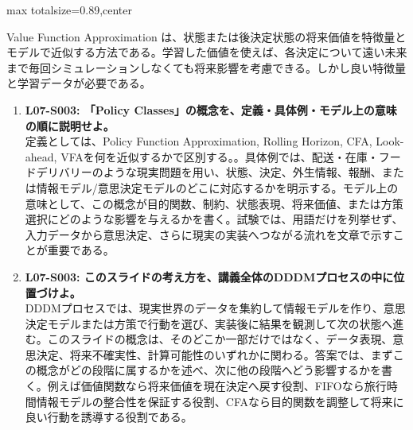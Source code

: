 \begin{minipage}[t]{0.58\textwidth}
\begin{adjustbox}{max totalsize={\textwidth}{0.89\textheight},center}
\begin{minipage}{\textwidth}
Value Function Approximation は、状態または後決定状態の将来価値を特徴量とモデルで近似する方法である。学習した価値を使えば、各決定について遠い未来まで毎回シミュレーションしなくても将来影響を考慮できる。しかし良い特徴量と学習データが必要である。\par{}\begin{enumerate}\item \textbf{L07-S003: 「Policy Classes」の概念を、定義・具体例・モデル上の意味の順に説明せよ。}\\定義としては、Policy Function Approximation, Rolling Horizon, CFA, Look-ahead, VFAを何を近似するかで区別する。。具体例では、配送・在庫・フードデリバリーのような現実問題を用い、状態、決定、外生情報、報酬、または情報モデル/意思決定モデルのどこに対応するかを明示する。モデル上の意味として、この概念が目的関数、制約、状態表現、将来価値、または方策選択にどのような影響を与えるかを書く。試験では、用語だけを列挙せず、入力データから意思決定、さらに現実の実装へつながる流れを文章で示すことが重要である。\item \textbf{L07-S003: このスライドの考え方を、講義全体のDDDMプロセスの中に位置づけよ。}\\DDDMプロセスでは、現実世界のデータを集約して情報モデルを作り、意思決定モデルまたは方策で行動を選び、実装後に結果を観測して次の状態へ進む。このスライドの概念は、そのどこか一部だけではなく、データ表現、意思決定、将来不確実性、計算可能性のいずれかに関わる。答案では、まずこの概念がどの段階に属するかを述べ、次に他の段階へどう影響するかを書く。例えば価値関数なら将来価値を現在決定へ戻す役割、FIFOなら旅行時間情報モデルの整合性を保証する役割、CFAなら目的関数を調整して将来に良い行動を誘導する役割である。\end{enumerate}
\end{minipage}
\end{adjustbox}
\end{minipage}



